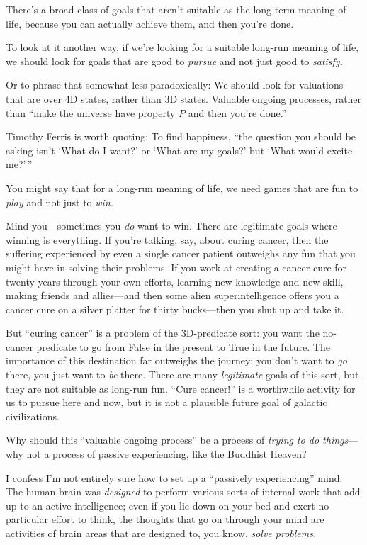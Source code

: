  There's a broad class of goals that
aren't suitable as the long-term meaning of life,
because you can actually achieve them, and then you're
done.


 To look at it another way, if we're looking for a
suitable long-run meaning of life, we should look for goals that are
good to \textit{pursue} and not just good to \textit{satisfy.}


 Or to phrase that somewhat less paradoxically: We should look for
valuations that are over 4D states, rather than 3D states. Valuable
ongoing processes, rather than ``make the universe
have property $P$ and then you're
done.''


 Timothy Ferris is worth quoting: To find happiness,
``the question you should be asking
isn't `What do I want?'
or `What are my goals?' but
`What would excite
me?'\,''


 You might say that for a long-run meaning of life, we need games
that are fun to \textit{play} and not just to \textit{win.}


 Mind you---sometimes you \textit{do} want to win. There are
legitimate goals where winning is everything. If you're
talking, say, about curing cancer, then the suffering experienced by
even a single cancer patient outweighs any fun that you might have in
solving their problems. If you work at creating a cancer cure for
twenty years through your own efforts, learning new knowledge and new
skill, making friends and allies---and then some alien
superintelligence offers you a cancer cure on a silver platter for
thirty bucks---then you shut up and take it.


 But ``curing cancer'' is a
problem of the 3D-predicate sort: you want the no-cancer predicate to
go from False in the present to True in the future. The importance of
this destination far outweighs the journey; you don't
want to \textit{go} there, you just want to \textit{be} there. There
are many \textit{legitimate} goals of this sort, but they are not
suitable as long-run fun. ``Cure
cancer!'' is a worthwhile activity for us to pursue
here and now, but it is not a plausible future goal of galactic
civilizations.


 Why should this ``valuable ongoing
process'' be a process of \textit{trying to do
things}{}---why not a process of passive experiencing, like the
Buddhist Heaven?


 I confess I'm not entirely sure how to set up a
``passively experiencing'' mind. The
human brain was \textit{designed} to perform various sorts of internal
work that add up to an active intelligence; even if you lie down on
your bed and exert no particular effort to think, the thoughts that go
on through your mind are activities of brain areas that are designed
to, you know, \textit{solve problems.}


